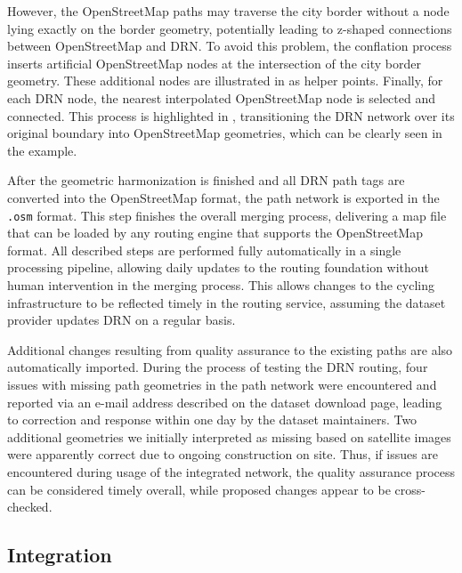 However, the OpenStreetMap paths may traverse the city border without a node lying exactly on the border geometry, potentially leading to z-shaped connections between OpenStreetMap and DRN. To avoid this problem, the conflation process inserts artificial OpenStreetMap nodes at the intersection of the city border geometry. These additional nodes are illustrated in  as helper points. Finally, for each DRN node, the nearest interpolated OpenStreetMap node is selected and connected. This process is highlighted in , transitioning the DRN network over its original boundary into OpenStreetMap geometries, which can be clearly seen in the example.

After the geometric harmonization is finished and all DRN path tags are converted into the OpenStreetMap format, the path network is exported in the \texttt{.osm} format. This step finishes the overall merging process, delivering a map file that can be loaded by any routing engine that supports the OpenStreetMap format. All described steps are performed fully automatically in a single processing pipeline, allowing daily updates to the routing foundation without human intervention in the merging process. This allows changes to the cycling infrastructure to be reflected timely in the routing service, assuming the dataset provider updates DRN on a regular basis. 

Additional changes resulting from quality assurance to the existing paths are also automatically imported. During the process of testing the DRN routing, four issues with missing path geometries in the path network were encountered and reported via an e-mail address described on the dataset download page, leading to correction and response within one day by the dataset maintainers. Two additional geometries we initially interpreted as missing based on satellite images were apparently correct due to ongoing construction on site. Thus, if issues are encountered during usage of the integrated network, the quality assurance process can be considered timely overall, while proposed changes appear to be cross-checked.

\subsection{Integration}

